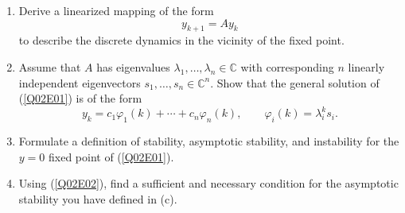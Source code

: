 \documentclass[twoside,10pt,a4paper]{article}
\begin{document}
\begin{enumerate}[label=(\alph*)]
	\item Derive a linearized mapping of the form
	\begin{equation}\label{Q02E01}
		y_{k+1} = Ay_k
	\end{equation}
	to describe the discrete dynamics in the vicinity of the fixed point.
	\item Assume that $A$ has eigenvalues $\lambda_1, \ldots, \lambda_n \in \mathbb{C}$ with corresponding $n$ linearly independent eigenvectors $s_1, \ldots, s_n \in \mathbb{C}^n$. Show that the general solution of (\ref{Q02E01}) is of the form
	\begin{equation}\label{Q02E02}
		y_k = c_1 \varphi_1(k) + \cdots + c_n \varphi_n(k), \qquad \varphi_i(k) = \lambda_i^ks_i.
	\end{equation}
	\item Formulate a definition of stability, asymptotic stability, and instability for the $y=0$ fixed point of (\ref{Q02E01}).
	\item Using (\ref{Q02E02}), find a sufficient and necessary condition for the asymptotic stability you have defined in (c).
\end{enumerate}
\end{document}
